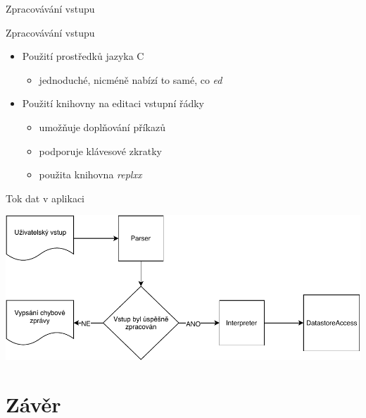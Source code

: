 \documentclass[czech,aspectratio=169]{beamer}
\newcommand{\Rplus}{\protect\hspace{-.1em}\protect\raisebox{.35ex}{\smaller{\smaller\textbf{+}}}}
\newcommand{\Cpp}{\mbox{C\Rplus\Rplus}\xspace}
\begin{document}
\begin{frame}[plain]
\begin{center}
\color{CVUT}
\Large Zpracovávání vstupu
\end{center}
\end{frame}

\begin{frame}{Zpracovávání vstupu}
    \begin{itemize}
        \item[] Použití prostředků jazyka \Cpp{}
            \pause{}
            \begin{itemize}
                \item jednoduché, nicméně nabízí to samé, co \textit{ed}
            \end{itemize}
        \pause{}
        \item[] Použití knihovny na editaci vstupní řádky
            \pause{}
            \begin{itemize}
                \item umožňuje doplňování příkazů
                \pause{}
                \item podporuje klávesové zkratky
                \pause{}
                \item použita knihovna \textit{replxx}
            \end{itemize}
    \end{itemize}
\end{frame}

\begin{frame}{Tok dat v aplikaci}
\begin{center}
    \includegraphics[width=.9\textwidth]{diagram}
\end{center}
\end{frame}

\section{Závěr}
\begin{frame}
\tableofcontents[currentsection]
\end{frame}
\end{document}

